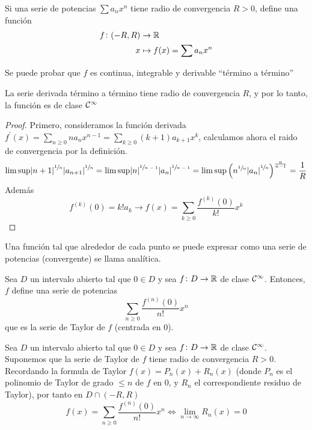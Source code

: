 \begin{defi}
	Si una serie de potencias $\sum a_n x^n$ tiene radio de convergencia $R > 0$,
	define una función
	\[\begin{aligned}
		f \colon (-R,R) &\to \mathbb{R} \\ x &\mapsto f(x) = \sum a_n x^n
	\end{aligned}\]
\end{defi}

\begin{obs*}
	Se puede probar que $f$ es continua, integrable y derivable
	``término a término''
\end{obs*}

\begin{obs*}
	La serie derivada término a término tiene radio de convergencia $R$, y por
	lo tanto, la función es de clase $\mathcal{C}^\infty$
\end{obs*}

\begin{proof}
	Primero, consideramos la función derivada $f^\prime (x) = \sum\limits_{n \geq 0}
	n a_n x^{n-1} = \sum\limits_{k \geq 0} (k+1) a_{k+1} x^k$, calculamos ahora
	el raido de convergencia por la definición.
	\[
		\limsup \abs{n+1}^{\sfrac{1}{n}}\abs{a_{n+1}}^{\sfrac{1}{n}} =
		\limsup \abs{n}^{\sfrac{1}{n-1}}\abs{a_{n}}^{\sfrac{1}{n-1}} =
		\limsup \left( n^{\sfrac{1}{n}} \abs{a_n}^{\sfrac{1}{n}} \right)^
		{\frac{n}{n-1}} = \frac{1}{R}
	\]
	Además
	\[
		f^{(k)}(0) = k! a_k \rightarrow f(x) = \sum_{k \geq 0} \frac{f^{(k)}(0)}
		{k!}x^k
	\]
\end{proof}

\begin{defi*}
	Una función tal que alrededor de cada punto se puede expresar como una serie
	de potencias (convergente) se llama analítica.
\end{defi*}

\begin{defi}
	Sea $D$ un intervalo abierto tal que $0 \in D$ y sea $f \colon D \to \mathbb{R}$
	de clase $\mathcal{C}^\infty$. Entonces, $f$ define una serie de potencias
	\[
		\sum_{n \geq 0} \frac{f^{(n)}(0)}{n!} x^n
	\]
	que es la serie de Taylor de $f$ (centrada en 0).
\end{defi}

\begin{prop*}
	Sea $D$ un intervalo abierto tal que $0 \in D$ y sea $f \colon D \to \mathbb{R}$
	de clase $\mathcal{C}^\infty$. Suponemos que la serie de Taylor de $f$ tiene radio
	de convergencia $R > 0$. Recordando la formula de Taylor $f(x) = P_n(x) + R_n(x)$
	(donde $P_n$ es el polinomio de Taylor de grado $\leq n$ de $f$ en 0, y $R_n$
	el correspondiente residuo de Taylor), por tanto en $D \cap (-R,R)$
	\[
		f(x) = \sum_{n \geq 0} \frac{f^{(n)}(0)}{n!}x^n \iff
		\lim_{n \to \infty} R_n(x) = 0
	\]
\end{prop*}

